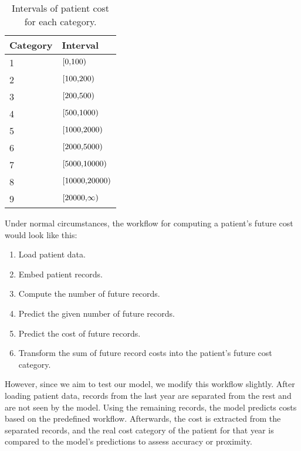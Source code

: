 \begin{table}[!h]
	\centering
	\begin{tabular}{|l|l|}
		\hline
		Category  & Interval \\ \hline
		1 & $\interval[{0,100})$ \\ \hline
		2 & $\interval[{100,200})$ \\ \hline
		3 & $\interval[{200,500})$ \\ \hline
		4 & $\interval[{500,1000})$ \\ \hline
		5 & $\interval[{1000,2000})$ \\ \hline
		6 & $\interval[{2000,5000})$ \\ \hline
		7 & $\interval[{5000,10000})$ \\ \hline
		8 & $\interval[{10000,20000})$ \\ \hline
		9 & $\interval[{20000,\infty})$ \\ \hline
	\end{tabular}
	\caption{Intervals of patient cost for each category.}
	\label{tab:patCost}
\end{table}  

Under normal circumstances, the workflow for computing a patient’s future cost would look like this:

\begin{enumerate}
	\item Load patient data.
	\item Embed patient records.
	\item Compute the number of future records.
	\item Predict the given number of future records.
	\item Predict the cost of future records.
	\item Transform the sum of future record costs into the patient’s future cost category.
\end{enumerate}

However, since we aim to test our model, we modify this workflow slightly. After loading patient data, records from the last year are separated from the rest and are not seen by the model. Using the remaining records, the model predicts costs based on the predefined workflow. Afterwards, the cost is extracted from the separated records, and the real cost category of the patient for that year is compared to the model’s predictions to assess accuracy or proximity.
